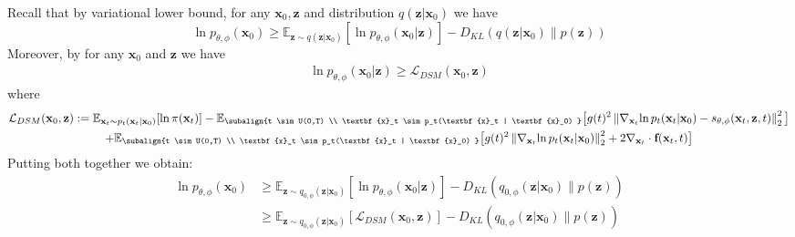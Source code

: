Recall that by variational lower bound, for any $\textbf{x}_0, \textbf{z}$ and distribution $q(\textbf{z} | \textbf{x}_0)$ we have
\begin{equation}
     \ln p_{\theta, \phi}(\textbf{x}_0) 
    \geq \mathbb{E}_{\textbf{z} \sim q(\textbf{z} | \textbf{x}_0)}[\ln p_{\theta, \phi}(\textbf{x}_0 | \textbf{z})] - D_{KL}( q(\textbf{z} | \textbf{x}_0) \parallel p(\textbf{z})) 
\end{equation}
Moreover, by \cite[Theorem 3]{song2021maximum} for any $\textbf{x}_0$ and $\textbf{z}$ we have
\begin{align}
 \ln p_{\theta, \phi}(\textbf{x}_0 | \textbf{z})  \geq \mathcal{L}_{DSM}(\textbf{x}_0, \textbf{z})
\end{align}
where
\begin{gather*}
    \mathcal{L}_{DSM}(\textbf{x}_0, \textbf{z}) :=
    \mathbb{E}_{\textbf{x}_t \sim p_t(\textbf{x}_t | \textbf{x}_0)}[\ln \pi(\textbf{x}_t)]  
    -   \mathbb{E}_{\subalign{t \sim U(0,T) \\ \textbf{x}_t \sim p_t(\textbf{x}_t | \textbf{x}_0) }} 
    \big[
    g(t)^2 \norm{ \nabla_{\textbf{x}_t}{\ln{p_t(\textbf{x}_t | \textbf{x}_0)}} - s_{\theta, \phi}(\textbf{x}_t, \textbf{z}, t)}_2^2  
    \big] \\
    + \mathbb{E}_{\subalign{t \sim U(0,T) \\ \textbf{x}_t \sim p_t(\textbf{x}_t | \textbf{x}_0) }} 
    \big[
    g(t)^2 \norm{ \nabla_{\textbf{x}_t}{\ln{p_t(\textbf{x}_t | \textbf{x}_0)}}}_2^2   + 2 \nabla_{\textbf{x}_t} \cdot \textbf{f}(\textbf{x}_t, t) 
    \big] 
\end{gather*}
Putting both together we obtain:
\begin{align*}
    \ln p_{\theta, \phi}(\textbf{x}_0) 
    &\geq \mathbb{E}_{\textbf{z} \sim q_{0,\phi}(\textbf{z} | \textbf{x}_0)}[\ln p_{\theta, \phi}(\textbf{x}_0 | \textbf{z})] -  D_{KL}( q_{0,\phi}(\textbf{z} | \textbf{x}_0) \parallel p(\textbf{z}))  \\
    &\geq \mathbb{E}_{\textbf{z} \sim q_{0,\phi}(\textbf{z} | \textbf{x}_0)}[\mathcal{L}_{DSM}(\textbf{x}_0, \textbf{z})] -  D_{KL}( q_{0,\phi}(\textbf{z} | \textbf{x}_0)  \parallel p(\textbf{z}))  
\end{align*}


